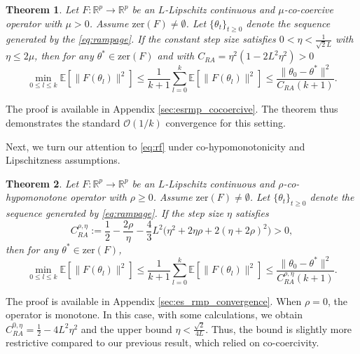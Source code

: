 \documentclass[letter,11pt]{article}
\newtheorem{theorem}{Theorem}[]
\begin{document}
\begin{theorem} \label{thm:esrmp_cocoercive}
Let $F: \mathbb{R}^p \to \mathbb{R}^p$ be an $L$-Lipschitz continuous and $\mu$-co-coercive operator with $\mu > 0$. Assume $\mathrm{zer}(F) \neq \emptyset$. Let $\{\theta_t\}_{t \ge 0}$ denote the sequence generated by the \eqref{eq:rampage}. If the constant step size satisfies $0 < \eta < \frac{1}{\sqrt{2}L} $ with $\eta \leq 2\mu$, then for any $\theta^* \in \mathrm{zer}(F)$ and with $C_{RA} = \eta^2 \left( 1 - 2L^2\eta^2 \right) > 0$
\begin{equation}
\min_{0 \le l \le k} \mathbb{E}\left[\|F(\theta_l)\|^2\right] \le \frac{1}{k+1} \sum_{l=0}^k \mathbb{E}\left[\|F(\theta_l)\|^2\right] \le \frac{\|\theta_0 - \theta^*\|^2}{C_{RA} (k+1)}.
\end{equation}
\end{theorem}
The proof is available in Appendix \ref{sec:esrmp_cocoercive}. The theorem thus demonstrates the standard $\mathcal{O}(1/k)$ convergence for this setting.

Next, we turn our attention to \eqref{eq:rf} under co-hypomonotonicity and Lipschitzness assumptions.
\begin{theorem} \label{thm:es_rmp_convergence}
Let $F: \mathbb{R}^p \to \mathbb{R}^p$ be an $L$-Lipschitz continuous and $\rho$-co-hypomonotone operator with $\rho \ge 0$. Assume $\mathrm{zer}(F) \neq \emptyset$. Let $\{\theta_t\}_{t \ge 0}$ denote the sequence generated by \eqref{eq:rampage}. If the step size $\eta$ satisfies
\begin{equation}
C_{RA}^{\rho,\eta} := \frac{1}{2} - \frac{2\rho}{\eta} - \frac{4}{3}L^2 \Big( \eta^2 + 2\eta\rho + 2(\eta + 2\rho)^2 \Big) > 0,
\end{equation}
then for any $\theta^* \in \mathrm{zer}(F)$,
\begin{equation}
\min_{0 \le l \le k} \mathbb{E}\left[\|F(\theta_l)\|^2\right] \le \frac{1}{k+1} \sum_{l=0}^k \mathbb{E}\left[\|F(\theta_l)\|^2\right] \le \frac{\|\theta_0 - \theta^*\|^2}{C_{RA}^{\rho,\eta} (k+1)}.
\end{equation}
\end{theorem}
The proof is available in Appendix \ref{sec:es_rmp_convergence}. When $\rho=0$, the operator is monotone. In this case, with some calculations, we obtain $
C_{RA}^{0,\eta} = \frac{1}{2} - 4L^2\eta^2$ and the upper bound $\eta < \frac{\sqrt{2}}{4L}$. Thus, the bound is slightly more restrictive compared to our previous result, which relied on co-coercivity.
\end{document}
